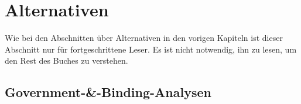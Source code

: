 







\section{Alternativen}

Wie bei den Abschnitten über Alternativen in den vorigen Kapiteln ist dieser Abschnitt nur für fortgeschrittene
Leser. Es ist nicht notwendig, ihn zu lesen, um den Rest des Buches zu verstehen.

\subsection{Government-\&-Binding-Analysen}
\label{sec-passive-GB}

